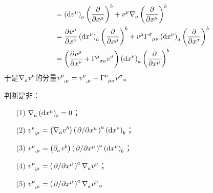 \begin{xiti}
\begin{zm}
\begin{enumerate}
\begin{align*}
			=&\tmu \tensor{\left(\dd{v^\mu}\right)}{_a} \tensor{\left(\pdv{x^\mu}\right)}{^b} + \tensor{v}{^\mu} \Nabla{a} \tensor{\left(\pdv{x^\mu}\right)}{^b}\\
			=&\; \pdv{\tensor{v}{^\mu}}{x^\nu} \tensor{\left(\dd{x^\nu}\right)}{_a} \tensor{\left(\pdv{x^\mu}\right)}{^b} + \tensor{v}{^\mu} \ChristoffelSymbol{\sigma}{\mu}{\nu} \tensor{\left(\dd{x^\nu}\right)}{_a} \tensor{\left(\pdv{x^\sigma}\right)}{^b}\\
			=&\tmu \left(\pdv{\tensor{v}{^\mu}}{x^\nu} +  \ChristoffelSymbol{\mu}{\sigma}{\nu} \tensor{v}{^\sigma} \right) \tensor{\left(\dd{x^\nu}\right)}{_a} \tensor{\left(\pdv{x^\mu}\right)}{^b}
			\end{align*}
			于是$\Nabla{a}\tensor{v}{^b}$的分量$\tensor{v}{^\nu_{;\mu}}=\tensor{v}{^\nu_{,\mu}}+\ChristoffelSymbol{\nu}{\mu}{\sigma} \tensor{v}{^\sigma} $。
		\end{enumerate}
	\end{zm}

	\item 判断是非：
	\begin{enumerate}
		\item[(1)] \hypertarget{3.5.1}{}$\Nabla{a} \tensor{\left(\dd{x^\mu}\right)}{_b} =0 $；
		\item[(2)] $\tensor{v}{^\nu_{;\mu}} = \left(\Nabla{a} \tensor{v}{^b} \right) \tensor{\left(\pd{x^\mu} \right)}{^a} \tensor{\left(\dd{x^\nu}\right)}{_b} $；
		\item[(3)] $\tensor{v}{^\nu_{,\mu}} = \left(\Partial{a} \tensor{v}{^b} \right) \tensor{\left(\pd{x^\mu} \right)}{^a} \tensor{\left(\dd{x^\nu}\right)}{_b} $；
		\item[(4)] \hypertarget{3.5.4}{} $\tensor{v}{^\nu_{;\mu}}=\tensor{\left(\pd{x^\mu}\right)}{^a} \Nabla{a} \tensor{v}{^\nu} $；
		\item[(5)] $\tensor{v}{^\nu_{,\mu}}=\tensor{\left(\pd{x^\mu}\right)}{^a} \Nabla{a} \tensor{v}{^\nu} $。
	\end{enumerate}


\end{xiti}
